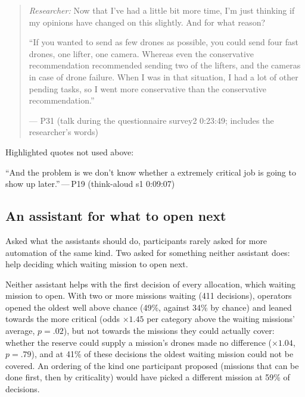 \begin{quote}\small
{\footnotesize\textit{Researcher:} Now that I've had a little bit more time, I'm just thinking if my opinions have changed on this slightly. And for what reason?}\par\smallskip
``If you wanted to send as few drones as possible, you could send four fast drones, one lifter, one camera. Whereas even the conservative recommendation recommended sending two of the lifters, and the cameras in case of drone failure. When I was in that situation, I had a lot of other pending tasks, so I went more conservative than the conservative recommendation.''\par\hfill--- P31 (talk during the questionnaire survey2 0:23:49; includes the researcher's words)
\end{quote}

\begin{options}


\noindent Highlighted quotes not used above:\begin{quotelist}
\item ``And the problem is we don't know whether a extremely critical job is going to show up later.''\,---\,P19 (think-aloud s1 0:09:07)
\end{quotelist}
\end{options}

\clearpage



\subsection{An assistant for what to open next}\label{sec:qual:new-jobs}

Asked what the assistants should do, participants rarely asked for more automation of the same kind. Two asked for something neither assistant does: help deciding which waiting mission to open next.


\label{sec:qual:new-jobs:queue-order}
Neither assistant helps with the first decision of every allocation, which waiting mission to open. With two or more missions waiting (411 decisions), operators opened the oldest well above chance (49\%, against 34\% by chance) and leaned towards the more critical (odds $\times 1.45$ per category above the waiting missions' average, $p = .02$), but not towards the missions they could actually cover: whether the reserve could supply a mission's drones made no difference ($\times 1.04$, $p = .79$), and at 41\% of these decisions the oldest waiting mission could not be covered. An ordering of the kind one participant proposed (missions that can be done first, then by criticality) would have picked a different mission at 59\% of decisions.

